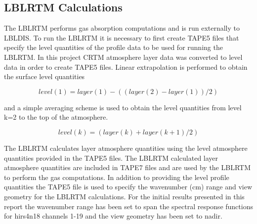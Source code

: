 \subsection{LBLRTM Calculations}
The LBLRTM performs gas absorption computations and is run externally to LBLDIS.
To run the LBLRTM it is necessary to first create TAPE5 files that specify the level quantities
of the profile data to be used for running the LBLRTM. In this project CRTM atmosphere layer data was converted to level data in
order to create TAPE5 files. Linear extrapolation is performed to obtain the surface level quantities 

\begin{equation}
level(1) = layer(1) - ((layer(2) - layer(1))/2)
\end{equation}          

and a simple averaging scheme is used to obtain the level quantities from level k=2 to the top of the atmosphere. 

\begin{equation}
level(k) = (layer(k) + layer(k+1)/2)
\end{equation}

The LBLRTM calculates layer atmosphere quantities using the level atmosphere quantities provided in the TAPE5 files. The LBLRTM calculated layer atmosphere quantities are included in TAPE7 files and are used by the LBLRTM to perform the gas computations.
In addition to providing the level profile quantities the TAPE5 file is used to specify the wavenumber (cm) range and view geometry for the LBLRTM calculations. For the initial results presented in this report the wavenumber range has been set to span the spectral response functions for hirs4\textunderscore{}n18 channels 1-19 and the view geometry has been set to nadir. 



   


